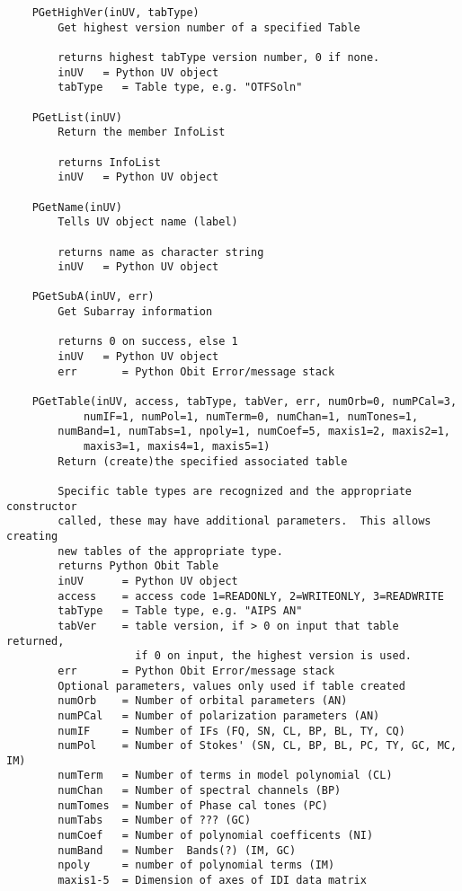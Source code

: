 \documentclass[11pt]{report}
\begin{document}
\begin{verbatim}
    PGetHighVer(inUV, tabType)
        Get highest version number of a specified Table
        
        returns highest tabType version number, 0 if none.
        inUV   = Python UV object
        tabType   = Table type, e.g. "OTFSoln"
    
    PGetList(inUV)
        Return the member InfoList
        
        returns InfoList
        inUV   = Python UV object
    
    PGetName(inUV)
        Tells UV object name (label)
        
        returns name as character string
        inUV   = Python UV object
    
    PGetSubA(inUV, err)
        Get Subarray information
        
        returns 0 on success, else 1
        inUV   = Python UV object
        err       = Python Obit Error/message stack
    
    PGetTable(inUV, access, tabType, tabVer, err, numOrb=0, numPCal=3,    
            numIF=1, numPol=1, numTerm=0, numChan=1, numTones=1,
	    numBand=1, numTabs=1, npoly=1, numCoef=5, maxis1=2, maxis2=1,
            maxis3=1, maxis4=1, maxis5=1)
        Return (create)the specified associated table
        
        Specific table types are recognized and the appropriate constructor
        called, these may have additional parameters.  This allows creating
        new tables of the appropriate type.
        returns Python Obit Table
        inUV      = Python UV object
        access    = access code 1=READONLY, 2=WRITEONLY, 3=READWRITE
        tabType   = Table type, e.g. "AIPS AN"
        tabVer    = table version, if > 0 on input that table returned,
                    if 0 on input, the highest version is used.
        err       = Python Obit Error/message stack
        Optional parameters, values only used if table created
        numOrb    = Number of orbital parameters (AN)
        numPCal   = Number of polarization parameters (AN)
        numIF     = Number of IFs (FQ, SN, CL, BP, BL, TY, CQ)
        numPol    = Number of Stokes' (SN, CL, BP, BL, PC, TY, GC, MC, IM)
        numTerm   = Number of terms in model polynomial (CL)
        numChan   = Number of spectral channels (BP)
        numTomes  = Number of Phase cal tones (PC)
        numTabs   = Number of ??? (GC)
        numCoef   = Number of polynomial coefficents (NI)
        numBand   = Number  Bands(?) (IM, GC)
        npoly     = number of polynomial terms (IM)
        maxis1-5  = Dimension of axes of IDI data matrix
    

\end{verbatim}
\end{document}

